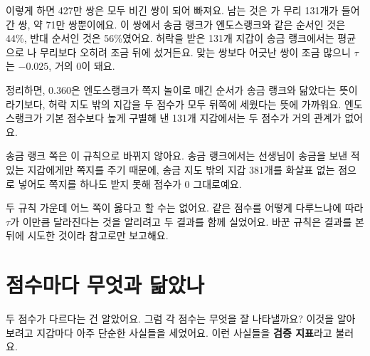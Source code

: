 \begin{deeper}[0.360을 조금 더 들여다보기]
\begin{center}
\end{center}

이렇게 하면 427만 쌍은 모두 비긴 쌍이 되어 빠져요.
남는 것은 가 무리 131개가 들어간 쌍, 약 71만 쌍뿐이에요.
이 쌍에서 송금 랭크가 엔도스랭크와 같은 순서인 것은 44\%, 반대 순서인 것은 56\%였어요.
허락을 받은 131개 지갑이 송금 랭크에서는 평균으로 나 무리보다 오히려 조금 뒤에 섰거든요.
맞는 쌍보다 어긋난 쌍이 조금 많으니 $\tau$는 $-0.025$, 거의 0이 돼요.

정리하면, 0.360은 엔도스랭크가 쪽지 놀이로 매긴 순서가 송금 랭크와 닮았다는 뜻이라기보다, 허락 지도 밖의 지갑을 두 점수가 모두 뒤쪽에 세웠다는 뜻에 가까워요.
엔도스랭크가 기본 점수보다 높게 구별해 낸 131개 지갑에서는 두 점수가 거의 관계가 없어요.

송금 랭크 쪽은 이 규칙으로 바뀌지 않아요.
송금 랭크에서는 선생님이 송금을 보낸 적 있는 지갑에게만 쪽지를 주기 때문에, 송금 지도 밖의 지갑 381개를 화살표 없는 점으로 넣어도 쪽지를 하나도 받지 못해 점수가 0 그대로예요.

두 규칙 가운데 어느 쪽이 옳다고 할 수는 없어요.
같은 점수를 어떻게 다루느냐에 따라 $\tau$가 이만큼 달라진다는 것을 알리려고 두 결과를 함께 실었어요.
바꾼 규칙은 결과를 본 뒤에 시도한 것이라 참고로만 보고해요.
\end{deeper}

\section{점수마다 무엇과 닮았나}

두 점수가 다르다는 건 알았어요.
그럼 각 점수는 무엇을 잘 나타낼까요?
이것을 알아보려고 지갑마다 아주 단순한 사실들을 세었어요.
이런 사실들을 \textbf{검증 지표}라고 불러요.

